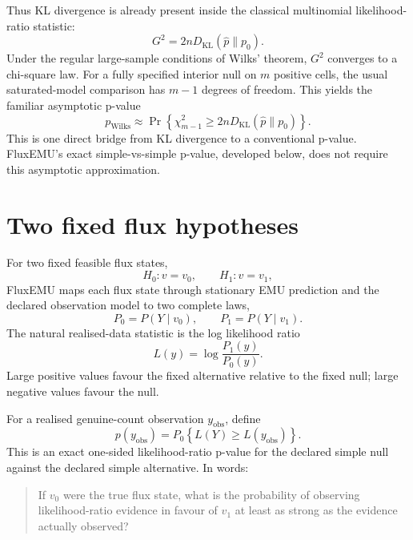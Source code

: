 \documentclass[11pt]{article}
\newcommand{\KL}{D_{\mathrm{KL}}}
\newcommand{\Pnull}{P_0}
\newcommand{\Palt}{P_1}
\begin{document}
Thus KL divergence is already present inside the classical multinomial
likelihood-ratio statistic:
\begin{equation}
\boxed{G^2=2n\KL(\widehat p\|p_0).}
\end{equation}
Under the regular large-sample conditions of Wilks' theorem, $G^2$ converges to
a chi-square law. For a fully specified interior null on $m$ positive cells,
the usual saturated-model comparison has $m-1$ degrees of freedom. This yields
the familiar asymptotic p-value
\begin{equation}
p_{\mathrm{Wilks}}
\approx
\Pr\!\left\{\chi^2_{m-1}\ge 2n\KL(\widehat p\|p_0)\right\}.
\end{equation}
This is one direct bridge from KL divergence to a conventional p-value.
FluxEMU's exact simple-vs-simple p-value, developed below, does not require this
asymptotic approximation.

\section{Two fixed flux hypotheses}

For two fixed feasible flux states,
\begin{equation}
H_0:v=v_0,
\qquad
H_1:v=v_1,
\end{equation}
FluxEMU maps each flux state through stationary EMU prediction and the declared
observation model to two complete laws,
\begin{equation}
\Pnull=P(Y\mid v_0),
\qquad
\Palt=P(Y\mid v_1).
\end{equation}
The natural realised-data statistic is the log likelihood ratio
\begin{equation}
L(y)=\log\frac{\Palt(y)}{\Pnull(y)}.
\end{equation}
Large positive values favour the fixed alternative relative to the fixed null;
large negative values favour the null.

For a realised genuine-count observation $y_{\mathrm{obs}}$, define
\begin{equation}
\boxed{
p(y_{\mathrm{obs}})
=
\Pnull\!\left\{L(Y)\ge L(y_{\mathrm{obs}})\right\}.
}
\end{equation}
This is an exact one-sided likelihood-ratio p-value for the declared simple
null against the declared simple alternative. In words:

\begin{quote}
If $v_0$ were the true flux state, what is the probability of observing
likelihood-ratio evidence in favour of $v_1$ at least as strong as the evidence
actually observed?
\end{quote}
\end{document}
